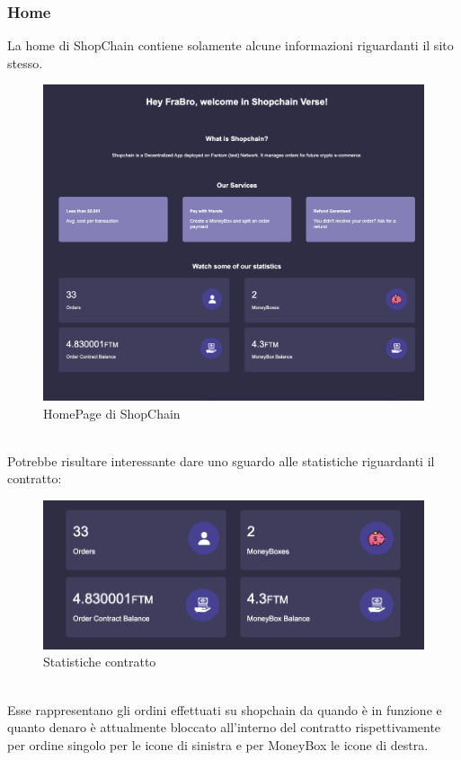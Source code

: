         \subsubsection{Home}
        La home di ShopChain contiene solamente alcune informazioni riguardanti il sito stesso.
        \begin{figure}[H]
            \centering
            \includegraphics[scale=0.3]{immagini/Home.png}
            \caption{HomePage di ShopChain}
        \end{figure}
        \textbf{}\\
        Potrebbe risultare interessante dare uno sguardo alle statistiche riguardanti il contratto:
        \begin{figure}[H]
            \centering
            \includegraphics[scale=0.4]{immagini/ContractDetails.png}
            \caption{Statistiche contratto}
        \end{figure}
        \textbf{}\\
        Esse rappresentano gli ordini effettuati su shopchain da quando è in funzione e quanto denaro è attualmente bloccato all'interno del contratto rispettivamente per ordine singolo per le icone di sinistra e per MoneyBox le icone di destra.
